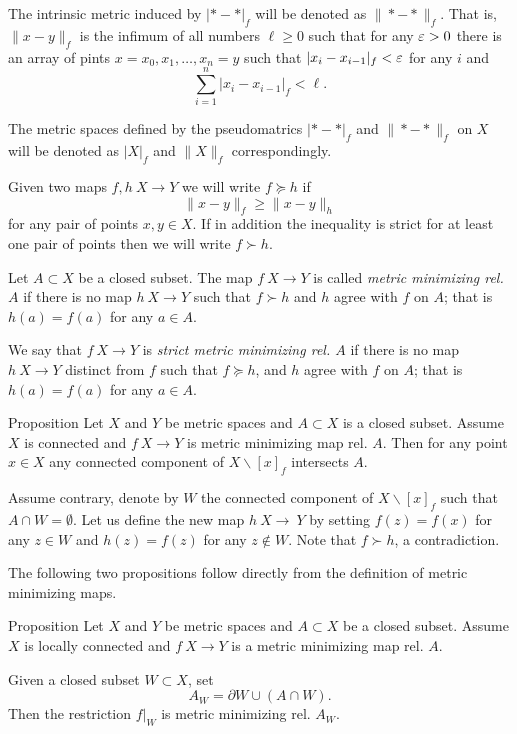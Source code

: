 \documentclass[a4paper,10pt]{amsart}
\begin{document}
The intrinsic metric induced by $|{*}-{*}|_f$ will be denoted as 
$\|{*}-{*}\|_f$. 
That is, 
$\|x-y\|_f$ is the infimum of all numbers $\ell\ge 0$ such that for any $\varepsilon>0$ there is an array of pints 
$x=x_0,x_1,\dots,x_n=y$ such that 
$|x_i-x_{i-1}|_f<\varepsilon$ for any $i$ and 
\[\sum_{i=1}^n|x_i-x_{i-1}|_f<\ell.\]

The metric spaces defined by the pseudomatrics $|{*}-{*}|_f$ 
and $\|{*}-{*}\|_f$ on $X$ will be denoted as $|X|_f$ and $\|X\|_f$ correspondingly.

Given two maps $f,h\:X\to Y$ we will write $f\succcurlyeq h$ if 
\[\|x-y\|_f\ge \|x-y\|_h\]
for any pair of points $x,y\in X$.
If in addition the inequality is strict for at least one pair of points then we will write $f\succ h$.

Let $A\subset X$ be a closed subset.
The map $f\:X\to Y$ is called \emph{metric minimizing rel. $A$}
if there is no map $h\:X\to Y$ such that $f\succ h$
and $h$ agree with $f$ on $A$;
that is $h(a)=f(a)$ for any $a\in A$.

We say that $f\:X\to Y$ is \emph{strict metric minimizing rel. $A$}
if there is no map $h\:X\to Y$ distinct from $f$
such that $f\succcurlyeq h$, 
and $h$ agree with $f$ on $A$;
that is $h(a)=f(a)$ for any $a\in A$.

\begin{thm}{Proposition}\label{prop:point-complement}
Let $X$ and $Y$ be  metric spaces 
and $A\subset X$ is a closed subset.
Assume $X$ is connected and $f\:X\to Y$ is metric minimizing map rel. $A$.
Then for any point $x\in X$ any connected component of $X\backslash [x]_f$ intersects $A$.

\end{thm}

Assume contrary, denote by $W$ the connected component of $X\backslash [x]_f$ such that $A\cap W=\emptyset$.
Let us define the new map $h\:X\to\ Y$ 
by setting $f(z)=f(x)$ for any $z\in W$
and $h(z)=f(z)$ for any $z\notin W$.
Note that $f\succ h$, a contradiction.
\qeds

The following two propositions follow directly from the definition of metric minimizing maps.

\begin{thm}{Proposition}\label{prop:subset}
Let $X$ and $Y$ be metric spaces and $A\subset X$ be a closed subset.
Assume $X$ is locally connected and $f\:X\to Y$ is a metric minimizing map rel. $A$.

Given a closed subset $W\subset X$, set 
\[A_W=\partial W\cup (A\cap W).\]
Then the restriction $f|_W$ is metric minimizing rel. $A_W$.
\end{thm}
\end{document}
